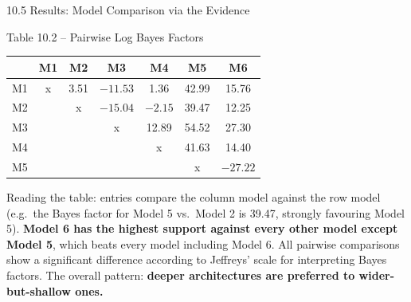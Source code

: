 \documentclass[aspectratio=169,10pt]{beamer}
\begin{document}
\begin{frame}[allowframebreaks]{10.5 Results: Model Comparison via the Evidence}
  \begin{block}{Table 10.2 -- Pairwise Log Bayes Factors}
    \begin{center}
    {\scriptsize
    \begin{tabular}{lcccccc}
      \toprule
       & \textbf{M1} & \textbf{M2} & \textbf{M3} & \textbf{M4} & \textbf{M5} & \textbf{M6} \\
      \midrule
      M1 & x & 3.51 & $-11.53$ & 1.36 & 42.99 & 15.76 \\
      M2 &   & x & $-15.04$ & $-2.15$ & 39.47 & 12.25 \\
      M3 &   &   & x & 12.89 & 54.52 & 27.30 \\
      M4 &   &   &   & x & 41.63 & 14.40 \\
      M5 &   &   &   &   & x & $-27.22$ \\
      \bottomrule
    \end{tabular}
    }
    \end{center}
    Reading the table: entries compare the column model against the row
    model (e.g.\ the Bayes factor for Model 5 vs.\ Model 2 is 39.47, strongly
    favouring Model 5). \textbf{Model 6 has the highest support against every
    other model except Model 5}, which beats every model including Model 6.
    All pairwise comparisons show a significant difference according to
    Jeffreys' scale for interpreting Bayes factors. The overall pattern:
    \textbf{deeper architectures are preferred to wider-but-shallow ones.}
  \end{block}

\end{frame}
\end{document}
